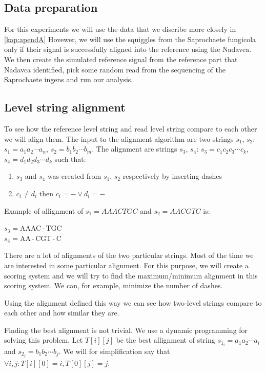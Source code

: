 \subsection{Data preparation}

For this experiments we will use the data that we discribe more closely in \ref{kap:apendA}
Hovewer, we will use the squiggles from the Saprochaete fungicola only if their signal
is successfully aligned into the reference using the Nadavca. We then create the
simulated reference signal from the reference part that Nadavca identified, pick
some random read from the sequencing of the Saprochaete ingens and run our analysis.

\subsection{Level string alignment}

To see how the reference level string and read level string compare to each other
we will align them. The input to the alignment algorithm are two strings $s_1$, $s_2$:
$s_1=a_1a_2\cdots a_n$, $s_2=b_1b_2\cdots b_m$. The alignment are strings
$s_3$, $s_4$: $s_3 = c_1c_2c_3\cdots c_k$, $s_4 = d_1d_2d_3\cdots d_k$
such that:

\begin{enumerate}
\item $s_3$ and $s_4$ was created from $s_1$, $s_2$ respectively by inserting dashes
\item $c_i \neq d_i$ then $c_i = - \lor d_i = -$
\end{enumerate}

Example of allignment of $s_1 = AAACTGC$ and $s_2 = AACGTC$ is:

\begin{center}
$s_3 = $AAAC\,-\,TGC\\
$s_4 = $AA\,-\,CGT\,-\,C
\end{center}

There are a lot of alignments of the two particular strings. Most of the time we
are interested in some particular alignment. For this purpose, we will create a
scoring system and we will try to find the maximum/minimum alignment in this scoring
system. We can, for example, minimize the number of dashes.

Using the alignment defined this way we can see how two-level strings compare to
each other and how similar they are.

Finding the best alignment is not trivial. We use a dynamic programming for
solving this problem. Let $T[i][j]$ be the best allignment of string $s_{1_i} = a_1a_2\cdots a_i$
and $s_{2_j} = b_1b_2\cdots b_j$. We will for simplification say that $\forall i, j: T[i][0] = i, T[0][j] = j$.

